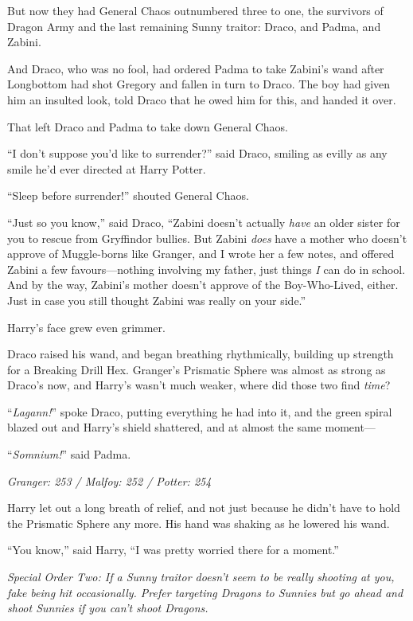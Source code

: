 But now they had General Chaos outnumbered three to one, the survivors of Dragon Army and the last remaining Sunny traitor: Draco, and Padma, and Zabini.

And Draco, who was no fool, had ordered Padma to take Zabini’s wand after Longbottom had shot Gregory and fallen in turn to Draco. The boy had given him an insulted look, told Draco that he owed him for this, and handed it over.

That left Draco and Padma to take down General Chaos.

“I don’t suppose you’d like to surrender?” said Draco, smiling as evilly as any smile he’d ever directed at Harry Potter.

“Sleep before surrender!” shouted General Chaos.

“Just so you know,” said Draco,
“Zabini doesn’t actually \emph{have} an older sister for you to rescue from Gryffindor bullies. But Zabini \emph{does} have a mother who doesn’t approve of Muggle-borns like Granger, and I wrote her a few notes, and offered Zabini a few favours—nothing involving my father, just things \emph{I} can do in school. And by the way, Zabini’s mother doesn’t approve of the Boy-Who-Lived, either. Just in case you still thought Zabini was really on your side.”

Harry’s face grew even grimmer.

Draco raised his wand, and began breathing rhythmically, building up strength for a Breaking Drill Hex. Granger’s Prismatic Sphere was almost as strong as Draco’s now, and Harry’s wasn’t much weaker, where did those two find \emph{time}?

“\emph{Lagann!}” spoke Draco, putting everything he had into it, and the green spiral blazed out and Harry’s shield shattered, and at almost the same moment—

“\emph{Somnium!}” said Padma.

\later

\emph{Granger: 253 / Malfoy: 252 / Potter: 254}

Harry let out a long breath of relief, and not just because he didn’t have to hold the Prismatic Sphere any more. His hand was shaking as he lowered his wand.

“You know,” said Harry,
“I was pretty worried there for a moment.”

\emph{Special Order Two: If a Sunny traitor doesn’t seem to be really shooting at you, fake being hit occasionally. Prefer targeting Dragons to Sunnies but go ahead and shoot Sunnies if you can’t shoot Dragons.}

